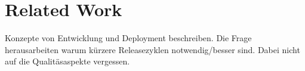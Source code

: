 \section{Related Work}

Konzepte von Entwicklung und Deployment beschreiben. Die Frage herausarbeiten
warum kürzere Releasezyklen notwendig/besser sind. Dabei nicht auf die
Qualitäsaspekte vergessen.